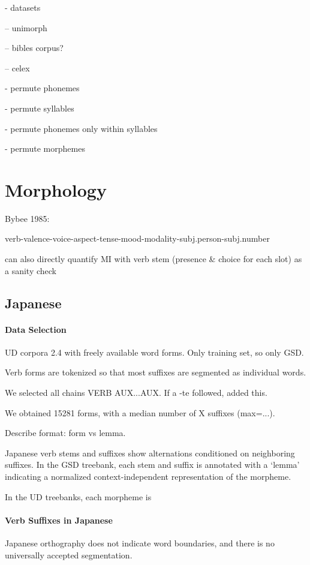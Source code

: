 - datasets

-- unimorph

-- bibles corpus?

-- celex


- permute phonemes

- permute syllables

- permute phonemes only within syllables

- permute morphemes 

\section{Morphology}

Bybee 1985:

verb-valence-voice-aspect-tense-mood-modality-subj.person-subj.number

can also directly quantify MI with verb stem (presence \& choice for each slot) as a sanity check


\subsection{Japanese}


\paragraph{Data Selection}

UD corpora 2.4 with freely available word forms. Only training set, so only GSD.

Verb forms are tokenized so that most suffixes are segmented as individual words.

We selected all chains VERB AUX...AUX. If a -te followed, added this.

We obtained 15281 forms, with a median number of X suffixes (max=...).

Describe format: form vs lemma.


Japanese verb stems and suffixes show alternations conditioned on neighboring suffixes.
In the GSD treebank, each stem and suffix is annotated with a `lemma' indicating a normalized context-independent representation of the morpheme.

In the UD treebanks, each morpheme is 


\paragraph{Verb Suffixes in Japanese}

Japanese orthography does not indicate word boundaries, and there is no universally accepted segmentation.

